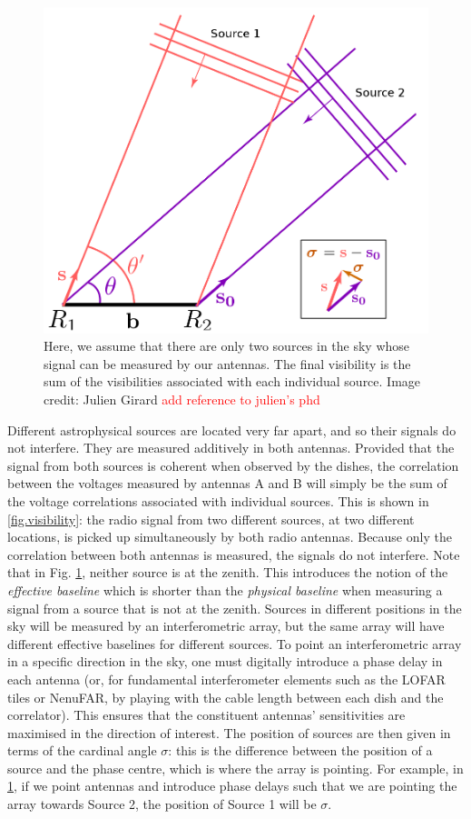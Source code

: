 \begin{figure}[ht]
\centering
\includegraphics[width=.5\textwidth]{images/visibility-measure.png}
\caption{\label{fig.visibility.measure} Here, we assume that there are only two sources in the sky whose signal can be measured by our antennas. The final visibility is the sum of the visibilities associated with each individual source. Image credit: Julien Girard \textcolor{red}{add reference to julien's phd}}
\end{figure}

\pg
Different astrophysical sources are located very far apart, and so their signals do not interfere. They are measured additively in both antennas. Provided that the signal from both sources is coherent when observed by the dishes, the correlation between the voltages measured by antennas A and B will simply be the sum of the voltage correlations associated with individual sources. This is shown in \cref{fig.visibility}: the radio signal from two different sources, at two different locations, is picked up simultaneously by both radio antennas. Because only the correlation between both antennas is measured, the signals do not interfere. %
\pg
Note that in Fig. \ref{fig.visibility.measure}, neither source is at the zenith. This introduces the notion of the \emph{effective baseline} which is shorter than the \emph{physical baseline} when measuring a signal from a source that is not at the zenith. Sources in different positions in the sky will be measured by an interferometric array, but the same array will have different effective baselines for different sources. To point an interferometric array in a specific direction in the sky, one must digitally introduce a phase delay in each antenna (or, for fundamental interferometer elements such as the LOFAR tiles or NenuFAR, by playing with the cable length between each dish and the correlator). This ensures that the constituent antennas' sensitivities are maximised in the direction of interest. The position of sources are then given in terms of the cardinal angle $\sigma$: this is the difference between the position of a source and the phase centre, which is where the array is pointing. For example, in \cref{fig.visibility.measure}, if we point antennas and introduce phase delays such that we are pointing the array towards Source 2, the position of Source 1 will be $\sigma$.

